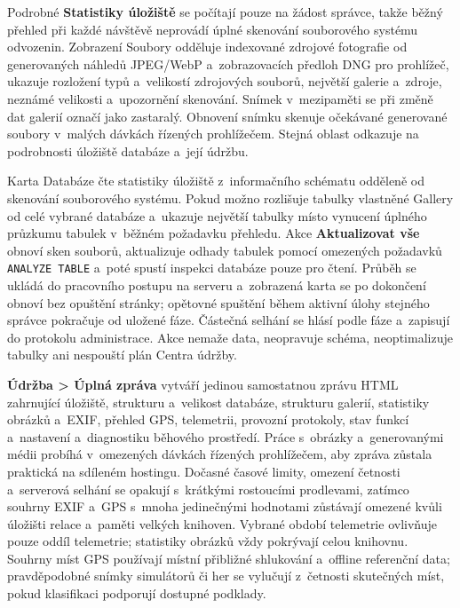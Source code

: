 \documentclass[11pt,a4paper]{article}
\newcommand{\ui}[1]{\textbf{#1}}
\newcommand{\codeword}[1]{\nolinkurl{#1}}
\begin{document}

Podrobné \ui{Statistiky úložiště} se počítají pouze na žádost správce, takže
běžný přehled při každé návštěvě neprovádí úplné skenování souborového systému
odvozenin. Zobrazení Soubory odděluje indexované zdrojové fotografie od
generovaných náhledů JPEG/WebP a~zobrazovacích předloh DNG pro prohlížeč,
ukazuje rozložení typů a~velikostí zdrojových souborů, největší galerie
a~zdroje, neznámé velikosti a~upozornění skenování. Snímek v~mezipaměti se při
změně dat galerií označí jako zastaralý. Obnovení snímku skenuje očekávané
generované soubory v~malých dávkách řízených prohlížečem. Stejná oblast odkazuje
na podrobnosti úložiště databáze a~její údržbu.

Karta Databáze čte statistiky úložiště z~informačního schématu odděleně od
skenování souborového systému. Pokud možno rozlišuje tabulky vlastněné Gallery
od celé vybrané databáze a~ukazuje největší tabulky místo vynucení úplného
průzkumu tabulek v~běžném požadavku přehledu. Akce \ui{Aktualizovat vše} obnoví
sken souborů, aktualizuje odhady tabulek pomocí omezených požadavků
\codeword{ANALYZE TABLE} a~poté spustí inspekci databáze pouze pro čtení. Průběh
se ukládá do pracovního postupu na serveru a~zobrazená karta se po dokončení
obnoví bez opuštění stránky; opětovné spuštění během aktivní úlohy stejného
správce pokračuje od uložené fáze. Částečná selhání se hlásí podle fáze
a~zapisují do protokolu administrace. Akce nemaže data, neopravuje schéma,
neoptimalizuje tabulky ani nespouští plán Centra údržby.

\ui{Údržba > Úplná zpráva} vytváří jedinou samostatnou zprávu HTML zahrnující
úložiště, strukturu a~velikost databáze, strukturu galerií, statistiky obrázků
a~EXIF, přehled GPS, telemetrii, provozní protokoly, stav funkcí a~nastavení
a~diagnostiku běhového prostředí. Práce s~obrázky a~generovanými médii probíhá
v~omezených dávkách řízených prohlížečem, aby zpráva zůstala praktická na
sdíleném hostingu. Dočasné časové limity, omezení četnosti a~serverová selhání
se opakují s~krátkými rostoucími prodlevami, zatímco souhrny EXIF a~GPS s~mnoha
jedinečnými hodnotami zůstávají omezené kvůli úložišti relace a~paměti velkých
knihoven. Vybrané období telemetrie ovlivňuje pouze oddíl telemetrie; statistiky
obrázků vždy pokrývají celou knihovnu. Souhrny míst GPS používají místní
přibližné shlukování a~offline referenční data; pravděpodobné snímky simulátorů
či her se vylučují z~četnosti skutečných míst, pokud klasifikaci podporují
dostupné podklady.
\end{document}
